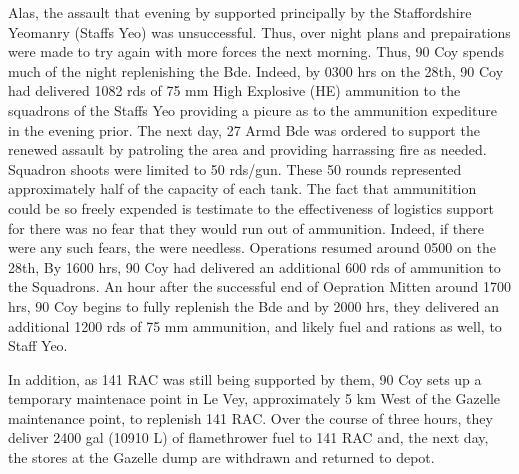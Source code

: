\documentclass[noraggedright]{turabian-researchpaper}
\begin{document}
Alas, the assault that evening by %
supported principally by the Staffordshire Yeomanry (Staffs Yeo) %
was unsuccessful.  Thus, over night plans and prepairations were made to try 
again with more forces the next morning.  Thus, 90 Coy spends much of the 
night replenishing the Bde.  Indeed, by 0300 hrs on the 28th, 90 Coy had 
delivered 1082 rds of 75 mm High Explosive (HE) ammunition to the squadrons
of the Staffs Yeo providing a picure as to the ammunition expediture in the 
evening prior.  The next day, 27 Armd Bde was ordered to support the renewed
assault by patroling the area and providing harrassing fire as needed.  
Squadron shoots were limited to 50 rds/gun.\autocite[Operation Instruction 
No 2 (see June appendix)]{27wd}  These 50 rounds represented 
approximately half of the capacity of each tank.  
The fact that ammunitition could be so freely expended is testimate to the 
effectiveness of logistics support for there was no fear that they would
run out of ammunition.  Indeed, if there were any such fears, the were 
needless.  Operations resumed around 0500 on the 28th, By 1600 hrs, 90 Coy 
had delivered an additional 600 rds of ammunition to the Squadrons. An hour 
after the successful end of Oepration Mitten around 1700 hrs, 90 Coy begins
to fully replenish the Bde and by 2000 hrs, they delivered an additional 
1200 rds of 75 mm ammunition, and likely fuel and rations as well, to Staff 
Yeo.\autocite[28 June 1944]{90wd}

In addition, as 141 RAC was still being supported by them, 90 Coy sets up a 
temporary maintenace point in Le Vey, approximately 5 km West of the Gazelle 
maintenance point, to replenish 141 RAC.  Over the course of three hours, they
deliver 2400 gal (10910 L) of flamethrower fuel to 141 RAC and, the next
day, the stores at the Gazelle dump are withdrawn and returned to 
depot.\autocite[28 -- 29 June 1944]{90wd} %
\end{document}
